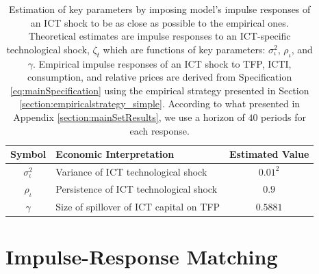\documentclass[12pt]{article}
\begin{document}
 	\begin{table}[h!]
	\begin{center}
		\begin{tabular}{clc}
			\hline
			Symbol & Economic Interpretation & Estimated Value \\
			\hline
            $\sigma^2_{\iota}$ & Variance of ICT technological shock &   $0.01^2$  \\
            $\rho_{\iota}$     & Persistence of ICT technological shock & $0.9$   \\
            $\gamma$           & Size of spillover of ICT capital on TFP &  $0.5881$ \\
			\hline
		\end{tabular}
		\caption{Estimation of key parameters by imposing model's impulse responses of an ICT shock to be as close as possible to the empirical ones. Theoretical estimates are impulse responses to an ICT-specific technological shock, $\zeta_t$ which are functions of key parameters: $\sigma_{\iota}^2$, $\rho_{\iota}$, and $\gamma$. Empirical impulse responses of an ICT shock to TFP, ICTI, consumption, and relative prices are derived from Specification \ref{eq:mainSpecification} using the empirical strategy presented in Section \ref{section:empiricalstrategy_simple}. According to what presented in Appendix \ref{section:mainSetResults}, we use a horizon of $40$ periods for each response.}
		\label{table:estimated_parameters}
	\end{center}
\end{table}


\newpage

\section{Impulse-Response Matching}\label{section:appendix_IR_matching}
 
\end{document}
